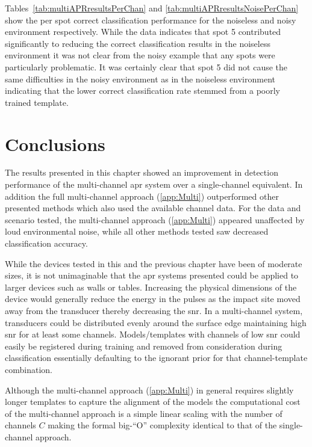Tables~\ref{tab:multiAPRresultsPerChan} and \ref{tab:multiAPRresultsNoisePerChan} show the per spot correct classification performance for the noiseless and noisy environment respectively. While the data indicates that spot 5 contributed significantly to reducing the correct classification results in the noiseless environment it was not clear from the noisy example that any spots were particularly problematic. It was certainly clear that spot 5 did not cause the same difficulties in the noisy environment as in the noiseless environment indicating that the lower correct classification rate stemmed from a poorly trained template.



\section{Conclusions}
The results presented in this chapter showed an improvement in detection performance of the multi-channel \gls{apr} system over a single-channel equivalent. In addition the full multi-channel approach (\ref{app:Multi}) outperformed other presented methods which also used the available channel data. For the data and scenario tested, the multi-channel approach (\ref{app:Multi}) appeared unaffected by loud environmental noise, while all other methods tested saw decreased classification accuracy.

While the devices tested in this and the previous chapter have been of moderate sizes, it is not unimaginable that the \gls{apr} systems presented could be applied to larger devices such as walls or tables. Increasing the physical dimensions of the device would generally reduce the energy in the pulses as the impact site moved away from the transducer thereby decreasing the \gls{snr}. In a multi-channel system, transducers could be distributed evenly around the surface edge maintaining high \gls{snr} for at least some channels. Models/templates with channels of low \gls{snr} could easily be registered during training and removed from consideration during classification essentially defaulting to the ignorant prior for that channel-template combination.

Although the multi-channel approach (\ref{app:Multi}) in general requires slightly longer templates to capture the alignment of the models the computational cost of the multi-channel approach is a simple linear scaling with the number of channels $C$ making the formal big-``O'' complexity identical to that of the single-channel approach.

